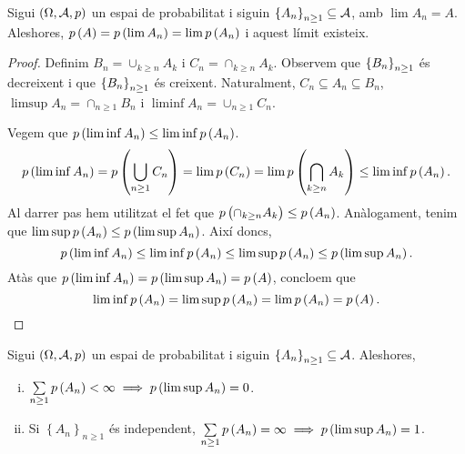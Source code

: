 \begin{prop}
    Sigui $\left(\Omega,\mathcal{A},p\right)$ un espai de probabilitat i siguin $\left\{ A_n\right\}_{n\geq1} \subseteq \mathcal{A}$, amb $\lim A_n=A$. Aleshores, $p\left( A\right) = p\left( \lim A_n\right) = \lim p \left( A_n\right)$ i aquest límit existeix.
\end{prop}
\begin{proof}
    Definim $B_n=\cup_{k\geq n}A_k$ i $C_n=\cap_{k\geq n}A_k$. Observem que $\left\{ B_n\right\}_{n\geq 1}$ és decreixent i que $\left\{ B_n\right\}_{n\geq 1}$ és creixent. Naturalment, $C_n\subseteq A_n\subseteq B_n$, $\limsup A_n = \cap_{n\geq 1} B_n$ i $\liminf A_n = \cup_{n\geq 1} C_n$.
    
    \noindent Vegem que $p\left(\liminf A_n\right)\leq\liminf p\left( A_n\right)$.
    \[
        p\left(\liminf A_n\right)=p\left(\bigcup_{n\geq 1} C_n\right) = \lim p\left( C_n\right)=\lim p\left( \bigcap_{k\geq n} A_k\right)\leq\liminf p\left( A_n\right).
    \]
    Al darrer pas hem utilitzat el fet que $p\left( \cap_{k\geq n} A_k\right)\leq p\left( A_n\right)$. Anàlogament, tenim que $\limsup p\left( A_n\right)\leq p\left(\limsup A_n\right)$. Així doncs,
    \[
        p\left(\liminf A_n\right)\leq\liminf p\left( A_n\right)\leq\limsup p\left( A_n\right)\leq p\left(\limsup A_n\right).
    \]
    Atàs que $p\left(\liminf A_n\right)=p\left(\limsup A_n\right)=p\left( A\right)$, concloem que 
    \[
        \liminf p\left( A_n\right)=\limsup p\left( A_n\right)=\lim p\left( A_n\right)=p\left( A\right).
    \]
\end{proof}
\begin{specialteo}
    Sigui $\left(\Omega,\mathcal{A},p\right)$ un espai de probabilitat i siguin $\left\{ A_n\right\}_{n\geq1} \subseteq \mathcal{A}$. Aleshores,
    \begin{enumerate}[i)]
        \item $\sum\limits_{n\geq 1} p\left( A_n\right)<\infty\implies p\left(\limsup A_n\right)=0$.
        \item Si $\left\{ A_n\right\}_{n\geq1}$ és independent, $\sum\limits_{n\geq 1} p\left( A_n\right)=\infty\implies p\left(\limsup A_n\right)=1$.
    \end{enumerate}
\end{specialteo}
